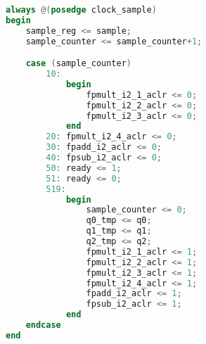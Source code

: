 \begin{lstlisting}[language=verilog,caption={Algorytm Goertzla -- obliczanie wyniku},label={lst:result}]
always @(posedge clock_sample)
begin
	sample_reg <= sample;
	sample_counter <= sample_counter+1;

	case (sample_counter)
		10:
			begin
				fpmult_i2_1_aclr <= 0;
				fpmult_i2_2_aclr <= 0;
				fpmult_i2_3_aclr <= 0;
 			end
		20:	fpmult_i2_4_aclr <= 0;
		30: fpadd_i2_aclr <= 0;
		40: fpsub_i2_aclr <= 0;
		50:	ready <= 1;
		51: ready <= 0;
		519:
			begin
				sample_counter <= 0;
				q0_tmp <= q0;
				q1_tmp <= q1;
				q2_tmp <= q2;
				fpmult_i2_1_aclr <= 1;
				fpmult_i2_2_aclr <= 1;
				fpmult_i2_3_aclr <= 1;
				fpmult_i2_4_aclr <= 1;
				fpadd_i2_aclr <= 1;
				fpsub_i2_aclr <= 1;
			end
	endcase
end
\end{lstlisting}
